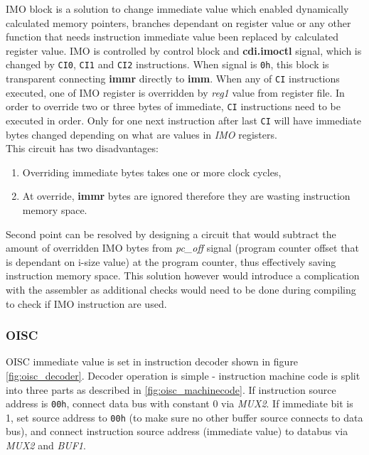 IMO block is a solution to change immediate value which enabled dynamically calculated memory pointers, branches dependant on register value or any other function that needs instruction immediate value been replaced by calculated register value. IMO is controlled by control block and \textbf{cdi.imoctl} signal, which is changed by \texttt{CI0}, \texttt{CI1} and \texttt{CI2} instructions. When signal is \texttt{0h}, this block is transparent connecting \textbf{immr} directly to \textbf{imm}. When any of \texttt{CI} instructions executed, one of IMO register is overridden by \textit{reg1} value from register file. In order to override two or three bytes of immediate, \texttt{CI} instructions need to be executed in order. Only for one next instruction after last \texttt{CI} will have immediate bytes changed depending on what are values in \textit{IMO} registers.
\\This circuit has two disadvantages: 
\begin{enumerate}
	\item Overriding immediate bytes takes one or more clock cycles,
	\item At override, \textbf{immr} bytes are ignored therefore they are wasting instruction memory space.
\end{enumerate}
Second point can be resolved by designing a circuit that would subtract the amount of overridden IMO bytes from \textit{pc\_off} signal (program counter offset that is dependant on i-size value) at the program counter, thus effectively saving instruction memory space. This solution however would introduce a complication with the assembler as additional checks would need to be done during compiling to check if IMO instruction are used.



\subsubsection{OISC}
OISC immediate value is set in instruction decoder shown in figure \ref{fig:oisc_decoder}. Decoder operation is simple - instruction machine code is split into three parts as described in \ref{fig:oisc_machinecode}. If instruction source address is \texttt{00h}, connect data bus with constant 0 via \textit{MUX2}. If immediate bit is 1, set source address to \texttt{00h} (to make sure no other buffer source connects to data bus), and connect instruction source address (immediate value) to databus via \textit{MUX2} and \textit{BUF1}. 

